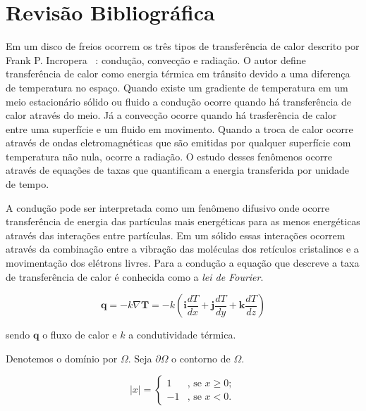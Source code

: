 \chapter{Revisão Bibliográfica}

Em um disco de freios ocorrem os três tipos de transferência de calor descrito por  Frank P. Incropera ~\cite{Lan50a}: condução, convecção e radiação. O autor define transferência de calor como energia térmica em trânsito devido a uma diferença de temperatura no espaço. Quando existe um gradiente de temperatura em um meio estacionário sólido ou fluido a condução ocorre quando há transferência de calor através do meio. Já a convecção ocorre quando há trasferência de calor entre uma superfície e um fluido em movimento. Quando a troca de calor ocorre através de ondas eletromagnéticas que são emitidas por qualquer superfície com temperatura não nula, ocorre a radiação. O estudo desses fenômenos ocorre através de equações de taxas que quantificam a energia transferida por unidade de tempo.

A condução pode ser interpretada como um fenômeno difusivo onde ocorre transferência de energia das partículas mais energéticas para as menos energéticas através das interações entre partículas. Em um sólido essas interações ocorrem através da combinação entre a vibração das moléculas dos retículos cristalinos e a movimentação dos elétrons livres. Para a condução a equação que descreve a taxa de transferência de calor é conhecida como a \textit{lei de Fourier}.

$$ \textbf{q} = -k \nabla \textbf{T} = -k \left(\textbf{i} \frac{dT}{dx} + \textbf{j} \frac{dT}{dy} + \textbf{k} \frac{dT}{dz} \right) $$

sendo $\textbf{q}$ o fluxo de calor e $k$ a condutividade térmica.



Denotemos o domínio por $\Omega$. Seja $\partial \Omega$ o contorno de
$\Omega$.

\begin{equation}
	|x| = \left\{ \begin{array}{ll}
	1 & \mbox{, se } x \geq 0; \\
	-1 & \mbox{, se } x < 0. \end{array} \right.
\end{equation}

